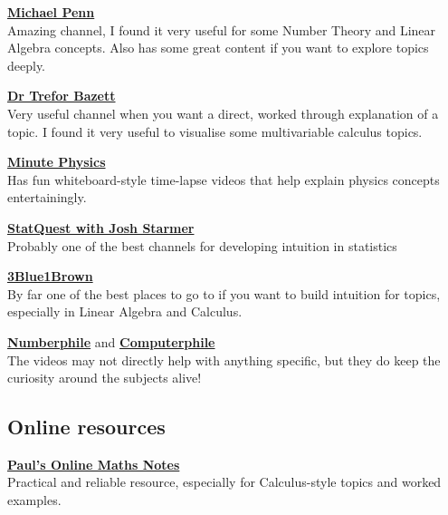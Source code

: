 \textbf{\href{https://www.youtube.com/@MichaelPennMath}{Michael Penn}} \\
Amazing channel, I found it very useful for some Number Theory and Linear Algebra concepts. Also has some great content if you want to explore topics deeply. 

\textbf{\href{https://www.youtube.com/c/drtreforbazett}{Dr Trefor Bazett}}\\
Very useful channel when you want a direct, worked through explanation of a topic. I found it very useful to visualise some multivariable calculus topics. 

\textbf{\href{https://www.youtube.com/@MinutePhysics}{Minute Physics}}\\
Has fun whiteboard-style time-lapse videos that help explain physics concepts entertainingly. 

\textbf{\href{https://www.youtube.com/@statquest}{StatQuest with Josh Starmer}}\\
Probably one of the best channels for developing intuition in statistics

\textbf{\href{https://www.youtube.com/@3blue1brown}{3Blue1Brown}} \\
By far one of the best places to go to if you want to build intuition for topics, especially in Linear Algebra and Calculus. 

\textbf{\href{https://www.youtube.com/numberphile}{Numberphile}} and \textbf{\href{https://www.youtube.com/@Computerphile}{Computerphile}}\\
The videos may not directly help with anything specific, but they do keep the curiosity around the subjects alive! 






\subsection{Online resources}

\textbf{\href{https://tutorial.math.lamar.edu/}{Paul's Online Maths Notes}} \\
Practical and reliable resource, especially for Calculus-style topics and worked examples. 

